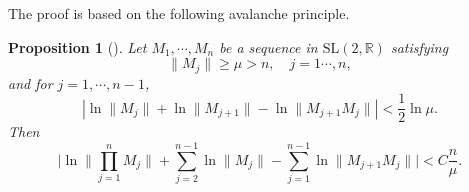\documentclass[reqno,12pt]{amsart}
\theoremstyle{plain}
\newtheorem{proposition}[theorem]{Proposition}
\theoremstyle{definition}
\numberwithin{equation}{section}
\begin{document}
The proof is based on the following  avalanche principle.
\begin{proposition}[\cite{MR1847592}]\label{AP}
    Let $M_{1},\cdots, M_{n}$ be a sequence in $\mathrm{SL}(2,\mathbb{R})$ satisfying
    \begin{equation*}
        \|M_{j}\|\geqslant \mu>n, \quad j=1\cdots,n,
    \end{equation*}
    and for $j=1,\cdots, n-1$,
    \begin{equation*}
        |\ln \|M_{j}\|+\ln \|M_{j+1}\| -\ln  \|M_{j+1}M_{j}\||< \frac{1}{2}\ln \mu.
    \end{equation*}
    Then
    \begin{equation*}
        \bigg|\ln \|\prod_{j=1}^{n} M_{j}\|+ \sum_{j=2}^{n-1} \ln \|M_{j}\|-\sum_{j=1}^{n-1} \ln \|M_{j+1}M_{j}\|\bigg|<C\frac{n}{\mu}.
    \end{equation*}
\end{proposition}
\end{document}
